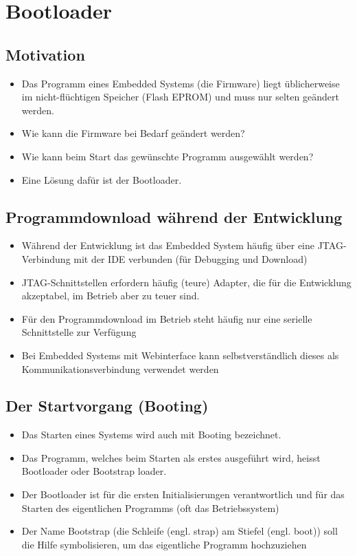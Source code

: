\section{Bootloader}
\subsection{Motivation}
\begin{itemize}
  \item Das Programm eines Embedded Systems (die Firmware) liegt üblicherweise im nicht-flüchtigen Speicher (Flash EPROM) und muss nur selten geändert werden.
  \item Wie kann die Firmware bei  Bedarf geändert werden?
  \item Wie kann beim Start das gewünschte Programm ausgewählt werden?
  \item Eine Lösung dafür ist der Bootloader.
\end{itemize}

\subsection{Programmdownload während der Entwicklung}
\begin{itemize}
  \item Während der Entwicklung ist das Embedded System häufig über eine JTAG-Verbindung mit der IDE verbunden (für Debugging und Download)
  \item JTAG-Schnittstellen erfordern häufig (teure) Adapter, die für die Entwicklung akzeptabel, im Betrieb aber zu teuer sind.
  \item Für den Programmdownload im Betrieb steht häufig nur eine serielle Schnittstelle zur Verfügung
  \item Bei Embedded Systems mit Webinterface kann selbstverständlich dieses als Kommunikationsverbindung verwendet werden
\end{itemize}

\subsection{Der Startvorgang (Booting)}
\begin{itemize}
  \item Das Starten eines Systems wird auch mit Booting bezeichnet.
  \item Das Programm, welches beim Starten als erstes ausgeführt wird, heisst Bootloader oder Bootstrap loader.
  \item Der Bootloader ist für die ersten Initialisierungen verantwortlich und für das Starten des eigentlichen Programms (oft das Betriebssystem)
  \item Der Name Bootstrap (die Schleife (engl. strap) am Stiefel (engl. boot)) soll die Hilfe symbolisieren, um das eigentliche Programm hochzuziehen
\end{itemize}

